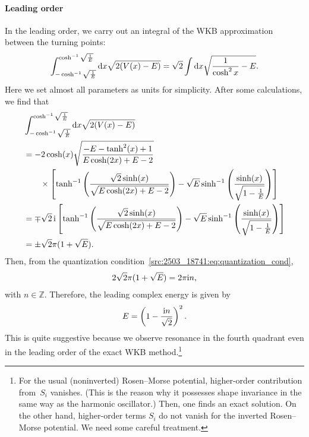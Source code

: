 \paragraph{Leading order}\label{src:2503_18741:sec:rm_leading}
In the leading order,
we carry out an integral of the WKB approximation between the turning points:
\begin{align}
    \int_{-\cosh^{-1}\sqrt{\frac{1}{E}}}^{\cosh^{-1}\sqrt{\frac{1}{E}}} \mathrm{d} x \sqrt{2(V(x) - E)}
    = \sqrt{2} \int \mathrm{d} x\sqrt{\frac{1}{\cosh^2 x} - E} .
\end{align}
Here we set almost all parameters as units for simplicity.
After some calculations, we find that
\begin{align}
    &\int_{-\cosh^{-1}\sqrt{\frac{1}{E}}}^{\cosh^{-1}\sqrt{\frac{1}{E}}} \mathrm{d} x \sqrt{2(V(x) - E)}\notag\\
    &= - 2 \cosh (x) 
   \sqrt{\frac{-E-\tanh ^2(x)+1}{E \cosh (2 x)+E-2}}
   \notag\\&\qquad\times
   \left[
   \tanh^{-1} \left(\frac{\sqrt{2} \sinh (x)}{\sqrt{E \cosh (2 x)+E-2}}\right)
   -\sqrt{E} \sinh ^{-1}\left(\frac{\sinh(x)}{\sqrt{1-\frac{1}{E}}}\right)
   \right]
   \\
    &= \mp \sqrt{2}\,\mathrm{i}
   \left[
   \tanh^{-1} \left(\frac{\sqrt{2} \sinh (x)}{\sqrt{E \cosh (2 x)+E-2}}\right)
   -\sqrt{E} \sinh ^{-1}\left(\frac{\sinh(x)}{\sqrt{1-\frac{1}{E}}}\right)
   \right]
   \\
   &= \pm \sqrt{2} \pi (1 + \sqrt{E}) .
\end{align}
Then, from the quantization condition~\eqref{src:2503_18741:eq:quantization_cond},
\begin{align}
    2 \sqrt{2} \pi (1 + \sqrt{E}) = 2\pi \mathrm{i} n,
\end{align}
with $n\in\mathbb{Z}$.
Therefore, the leading complex energy is given by
\begin{align}
    E = \left( 1 - \frac{\mathrm{i} n}{\sqrt{2}} \right)^2 .
\end{align}
This is quite suggestive because we observe resonance in the fourth quadrant even in the leading order of the exact WKB method.\footnote{For the usual (noninverted) Rosen--Morse potential, higher-order contribution from~$S_i$ vanishes. (This is the reason why it possesses shape invariance in the same way as the harmonic oscillator.) Then, one finds an exact solution. On the other hand, higher-order terms $S_i$ do not vanish for the inverted Rosen--Morse potential. We need some careful treatment.}
